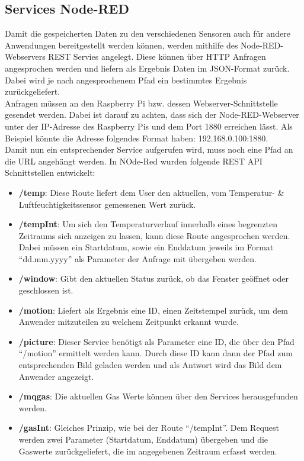 \subsection{Services Node-RED}
Damit die gespeicherten Daten zu den verschiedenen Sensoren auch für andere Anwendungen bereitgestellt werden können, werden mithilfe des Node-RED-Webservers REST Servies angelegt. Diese können über \ac{HTTP} Anfragen angesprochen werden und liefern als Ergebnis Daten im \ac{JSON}-Format zurück. Dabei wird je nach angesprochenem Pfad ein bestimmtes Ergebnis zurückgeliefert. \\Anfragen müssen an den Raspberry Pi bzw. dessen Webserver-Schnittstelle gesendet werden. Dabei ist darauf zu achten, dass sich der Node-RED-Webserver unter der \ac{IP}-Adresse des Raspberry Pis und dem Port 1880 erreichen lässt. Als Beispiel könnte die Adresse folgendes Format haben: 192.168.0.100:1880. \\Damit nun ein entsprechender Service aufgerufen wird, muss noch eine Pfad an die \ac{URL} angehängt werden. In NOde-Red wurden folgende REST \ac{API} Schnittstellen entwickelt:
\begin{itemize}
	\item \textbf{/temp}: Diese Route liefert dem User den aktuellen, vom Temperatur- \& Luftfeuchtigkeitssensor gemessenen Wert zurück. 
	\item \textbf{/tempInt}: Um sich den Temperaturverlauf innerhalb eines begrenzten Zeitraums sich anzeigen zu lassen, kann diese Route angesprochen werden. Dabei müssen ein Startdatum, sowie ein Enddatum jeweils im Format \enquote{dd.mm.yyyy} als Parameter der Anfrage mit übergeben werden.
	\item \textbf{/window}: Gibt den aktuellen Status zurück, ob das Fenster geöffnet oder geschlossen ist.
	\item \textbf{/motion}: Liefert als Ergebnis eine ID, einen Zeitstempel zurück, um dem Anwender mitzuteilen zu welchem Zeitpunkt erkannt wurde.
	\item \textbf{/picture}: Dieser Service benötigt als Parameter eine ID, die über den Pfad \enquote{/motion} ermittelt werden kann. Durch diese ID kann dann der Pfad zum entsprechenden Bild geladen werden und als Antwort wird das Bild dem Anwender angezeigt.
	\item \textbf{/mqgas}: Die aktuellen Gas Werte können über den Services herausgefunden werden.
	\item \textbf{/gasInt}: Gleiches Prinzip, wie bei der Route \enquote{/tempInt}. Dem Request werden zwei Parameter (Startdatum, Enddatum) übergeben und die Gaswerte zurückgeliefert, die im angegebenen Zeitraum erfasst werden.
\end{itemize}

